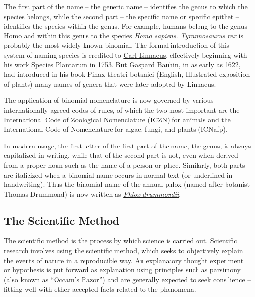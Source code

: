 The first part of the name -- the generic name -- identifies the genus to which the species belongs, while the second part -- the specific name or specific epithet -- identifies the species within the genus. For example, humans belong to the genus Homo and within this genus to the species \emph{Homo sapiens}. \emph{Tyrannosaurus rex} is probably the most widely known binomial. The formal introduction of this system of naming species is credited to \href{https://en.wikipedia.org/wiki/Carl_Linnaeus}{Carl Linnaeus}, effectively beginning with his work Species Plantarum in 1753. But \href{https://en.wikipedia.org/wiki/Gaspard_Bauhin}{Gaspard Bauhin}, in as early as 1622, had introduced in his book Pinax theatri botanici (English, Illustrated exposition of plants) many names of genera that were later adopted by Linnaeus.

The application of binomial nomenclature is now governed by various internationally agreed codes of rules, of which the two most important are the International Code of Zoological Nomenclature (ICZN) for animals and the International Code of Nomenclature for algae, fungi, and plants (ICNafp).

In modern usage, the first letter of the first part of the name, the genus, is always capitalized in writing, while that of the second part is not, even when derived from a proper noun such as the name of a person or place. Similarly, both parts are italicized when a binomial name occurs in normal text (or underlined in handwriting). Thus the binomial name of the annual phlox (named after botanist Thomas Drummond) is now written as \href{https://en.wikipedia.org/wiki/Phlox_drummondii}{\emph{Phlox drummondii}}.

\hypertarget{the-scientific-method}{%
\subsection{The Scientific Method}\label{the-scientific-method}}

The \href{https://en.wikipedia.org/wiki/Scientific_method}{scientific method} is the process by which science is carried out. Scientific research involves using the scientific method, which seeks to objectively explain the events of nature in a reproducible way. An explanatory thought experiment or hypothesis is put forward as explanation using principles such as parsimony (also known as ``Occam's Razor'') and are generally expected to seek consilience -- fitting well with other accepted facts related to the phenomena.


